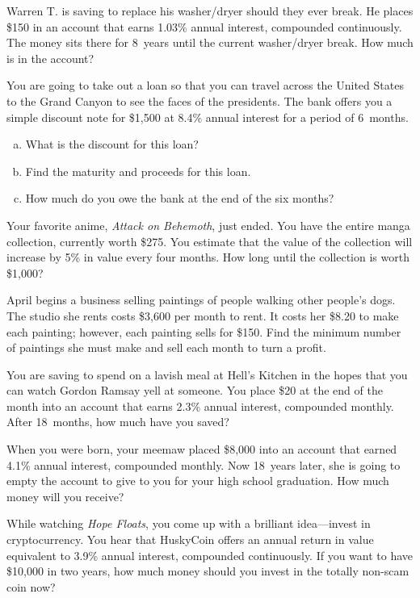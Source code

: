 \documentclass[12pt,letterpaper]{exam}
\begin{document}
\begin{questions}
	

\newpage
\question[10] Warren T. is saving to replace his washer/dryer should they ever break. He places \$150 in an account that earns 1.03\% annual interest, compounded continuously. The money sits there for 8~years until the current washer/dryer break. How much is in the account?



\newpage
\question[10] You are going to take out a loan so that you can travel across the United States to the Grand Canyon to see the faces of the presidents. The bank offers you a simple discount note for \$1,500 at 8.4\% annual interest for a period of 6~months. 
	\begin{enumerate}[(a)]
	\item What is the discount for this loan?
	\item Find the maturity and proceeds for this loan. 
	\item How much do you owe the bank at the end of the six months?
	\end{enumerate}



\newpage
\question[10] Your favorite anime, \textit{Attack on Behemoth}, just ended. You have the entire manga collection, currently worth \$275. You estimate that the value of the collection will increase by 5\% in value every four months. How long until the collection is worth \$1,000?



\newpage
\question[10] April begins a business selling paintings of people walking other people's dogs. The studio she rents costs \$3,600 per month to rent. It costs her \$8.20 to make each painting; however, each painting sells for \$150. Find the minimum number of paintings she must make and sell each month to turn a profit. 



\newpage
\question[10] You are saving to spend on a lavish meal at Hell's Kitchen in the hopes that you can watch Gordon Ramsay yell at someone. You place \$20 at the end of the month into an account that earns 2.3\% annual interest, compounded monthly. After 18~months, how much have you saved?



\newpage
\question[10] When you were born, your meemaw placed \$8,000 into an account that earned 4.1\% annual interest, compounded monthly. Now 18~years later, she is going to empty the account to give to you for your high school graduation. How much money will you receive? 



\newpage
\question[10] While watching \textit{Hope Floats}, you come up with a brilliant idea---invest in cryptocurrency. You hear that HuskyCoin offers an annual return in value equivalent to 3.9\% annual interest, compounded continuously. If you want to have \$10,000 in two years, how much money should you invest in the totally non-scam coin now?


\end{questions}
\end{document}
